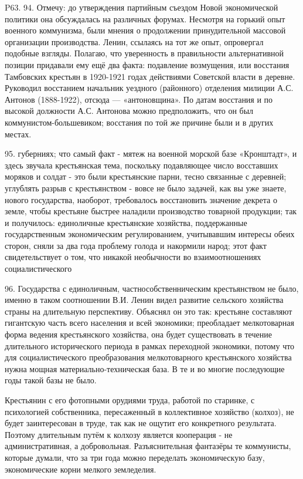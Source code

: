 P63. 94. Отмечу: до утверждения партийным съездом Новой экономической политики она обсуждалась на различных форумах. Несмотря на горький опыт военного коммунизма, были мнения о продолжении принудительной массовой организации производства. Ленин, ссылаясь на тот же опыт, опровергал подобные взгляды. Полагаю, что уверенность в правильности альтернативной позиции придавали ему ещё два факта: подавление возмущения, или восстания Тамбовских крестьян в 1920-1921 годах действиями Советской власти в деревне. Руководил восстанием начальник уездного (районного) отделения милиции А.С. Антонов (1888-1922), отсюда — «антоновщина». По датам восстания и по высокой должности А.С. Антонова можно предположить, что он был коммунистом-большевиком; восстания по той же причине были и в других местах.

95. губерниях; что самый факт - мятеж на военной морской базе «Кронштадт», и здесь звучала крестьянская тема, поскольку подавляющее число восставших моряков и солдат - это были крестьянские парни, тесно связанные с деревней; углублять разрыв с крестьянством - вовсе не было задачей, как вы уже знаете, нового государства, наоборот, требовалось восстановить значение декрета о земле, чтобы крестьяне быстрее наладили производство товарной продукции; так и получилось: единоличные крестьянские хозяйства, поддержанные государственным экономическим регулированием, учитывавшим интересы обеих сторон, сняли за два года проблему голода и накормили народ; этот факт свидетельствует о том, что никакой необычности во взаимоотношениях социалистического

96. Государства с единоличным, частнособственническим крестьянством не было, именно в таком соотношении В.И. Ленин видел развитие сельского хозяйства страны на длительную перспективу. Объяснял он это так: крестьяне составляют гигантскую часть всего населения и всей экономики; преобладает мелкотоварная форма ведения крестьянского хозяйства, она будет существовать в течение длительного исторического периода в рамках переходной экономики, потому что для социалистического преобразования мелкотоварного крестьянского хозяйства нужна мощная материально-техническая база. В те и во многие последующие годы такой базы не было.

Крестьянин с его фотопными орудиями труда, работой по старинке, с психологией собственника, пересаженный в коллективное хозяйство (колхоз), не будет заинтересован в труде, так как не ощутит его конкретного результата. Поэтому длительным путём к колхозу является кооперация - не административная, а добровольная. Разъяснительная фантазёры те коммунисты, которые думали, что за три года можно переделать экономическую базу, экономические корни мелкого земледелия.

